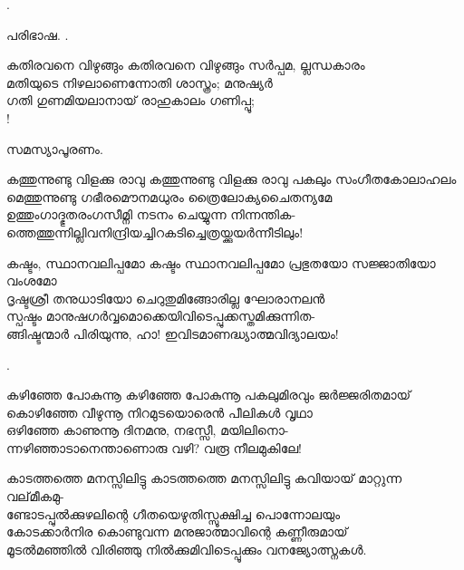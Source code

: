 \begin{enumerate}
.

പരിഭാഷ.  .

\begin{slokam}{\VMl}{\UN}{കതിരവനെ വിഴുങ്ങും}
കതിരവനെ വിഴുങ്ങും സർപ്പമ, ല്ലന്ധകാരം \\
മതിയുടെ നിഴലാണെന്നോതി ശാസ്ത്രം; മനുഷ്യർ \\
ഗതി ഗുണമിയലാനായ് രാഹുകാലം ഗണിപ്പൂ; \\
!
\end{slokam}



സമസ്യാപൂരണം. 

\begin{slokam}{\VSv}{\KKR}{കത്തുന്നുണ്ടു വിളക്കു രാവു}
കത്തുന്നുണ്ടു വിളക്കു രാവു പകലും സംഗീതകോലാഹലം\\
മെത്തുന്നുണ്ടു ഗഭീരമൌനമധുരം ത്രൈലോക്യചൈതന്യമേ\\
ഉത്തുംഗാദ്ഭുതരംഗസീമ്നി നടനം ചെയ്യുന്ന നിന്നന്തിക-\\
ത്തെത്തുന്നില്ലിവനിന്ദ്രിയച്ചിറകടിച്ചെത്രയ്ക്കുയര്‍ന്നീടിലും!
\end{slokam}


\begin{slokam}{\VSv}{\KA}{കഷ്ടം, സ്ഥാനവലിപ്പമോ}
കഷ്ടം സ്ഥാനവലിപ്പമോ പ്രഭുതയോ സജ്ജാതിയോ വംശമോ\\
ദൃഷ്ടശ്രീ തനുധാടിയോ ചെറുതുമിങ്ങോരില്ല ഘോരാനലൻ\\
സ്പഷ്ടം മാനുഷഗർവ്വമൊക്കെയിവിടെപ്പുക്കസ്തമിക്കുന്നിത-\\
ങ്ങിഷ്ടന്മാർ പിരിയുന്നു, ഹാ! ഇവിടമാണദ്ധ്യാത്മവിദ്യാലയം!
\end{slokam}


.

\begin{slokam}{\VSk}{\KND}{കഴിഞ്ഞേ പോകുന്നൂ}
കഴിഞ്ഞേ പോകുന്നൂ പകലുമിരവും ജർജ്ജരിതമായ്‌\\
കൊഴിഞ്ഞേ വീഴുന്നൂ നിറമുടയൊരെൻ പീലികള്‍ വൃഥാ\\
ഒഴിഞ്ഞേ കാണുന്നൂ ദിനമനു, നഭസ്സീ, മയിലിനൊ-\\
ന്നഴിഞ്ഞാടാനെന്താണൊരു വഴി? വരൂ നീലമുകിലേ!
\end{slokam}


\begin{slokam}{\VSv}{\VRV}{കാടത്തത്തെ മനസ്സിലിട്ടു}
കാടത്തത്തെ മനസ്സിലിട്ടു കവിയായ്‌ മാറ്റുന്ന വല്‌മീകമു-\\
ണ്ടോടപ്പുൽക്കുഴലിന്റെ ഗീതയെഴുതിസ്സൂക്ഷിച്ച പൊന്നോലയും\\
കോടക്കാർനിര കൊണ്ടുവന്ന മനുജാത്മാവിന്റെ കണ്ണീരുമായ്‌\\
മൂടൽമഞ്ഞിൽ വിരിഞ്ഞു നിൽക്കുമിവിടെപ്പൂക്കും വനജ്യോത്സ്നകള്‍.
\end{slokam}


\end{enumerate}
